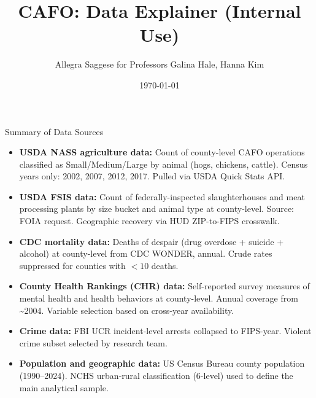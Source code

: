 \documentclass[aspectratio=169]{beamer}
\title{CAFO: Data Explainer (Internal Use)}
\author{Allegra Saggese for Professors Galina Hale, Hanna Kim}
\date{\today}
\begin{document}
\begin{frame}
  \titlepage
\end{frame}


\begin{frame}{Summary of Data Sources}
\begin{itemize}
    \item \textbf{USDA NASS agriculture data:} Count of county-level CAFO operations classified as Small/Medium/Large by animal (hogs, chickens, cattle). Census years only: 2002, 2007, 2012, 2017. Pulled via USDA Quick Stats API.
    \item \textbf{USDA FSIS data:} Count of federally-inspected slaughterhouses and meat processing plants by size bucket and animal type at county-level. Source: FOIA request. Geographic recovery via HUD ZIP-to-FIPS crosswalk.
    \item \textbf{CDC mortality data:} Deaths of despair (drug overdose + suicide + alcohol) at county-level from CDC WONDER, annual. Crude rates suppressed for counties with $<10$ deaths.
    \item \textbf{County Health Rankings (CHR) data:} Self-reported survey measures of mental health and health behaviors at county-level. Annual coverage from \textasciitilde2004. Variable selection based on cross-year availability.
    \item \textbf{Crime data:} FBI UCR incident-level arrests collapsed to FIPS-year. Violent crime subset selected by research team.
    \item \textbf{Population and geographic data:} US Census Bureau county population (1990--2024). NCHS urban-rural classification (6-level) used to define the main analytical sample.
\end{itemize}
\end{frame}

\end{document}

